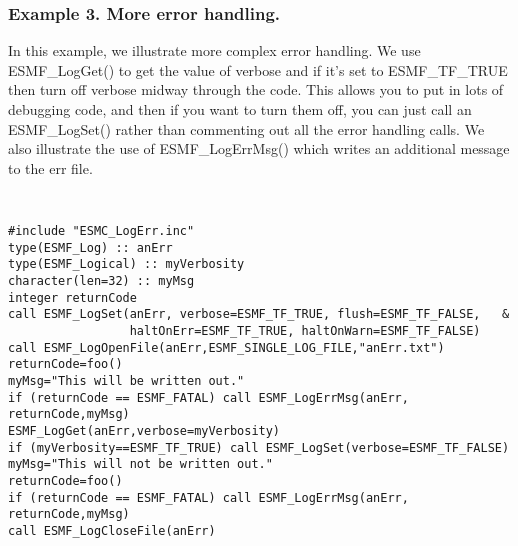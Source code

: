 \subsubsection{Example 3. More error handling.}

In this example, we illustrate more complex error handling.  We use
ESMF\_LogGet() to get the value of verbose and if it's set to ESMF\_TF\_TRUE
then turn off verbose midway through the code.  This allows you to put in lots
of debugging code, and then if you want to turn them off, you can just call
an ESMF\_LogSet() rather than commenting out all the error handling calls.
We also illustrate the use 
of ESMF\_LogErrMsg() which writes an additional message to the err file.

{\tt
\begin{verbatim}
#include "ESMC_LogErr.inc" 
type(ESMF_Log) :: anErr
type(ESMF_Logical) :: myVerbosity
character(len=32) :: myMsg
integer returnCode 
call ESMF_LogSet(anErr, verbose=ESMF_TF_TRUE, flush=ESMF_TF_FALSE,   &
                 haltOnErr=ESMF_TF_TRUE, haltOnWarn=ESMF_TF_FALSE)
call ESMF_LogOpenFile(anErr,ESMF_SINGLE_LOG_FILE,"anErr.txt")
returnCode=foo()
myMsg="This will be written out."
if (returnCode == ESMF_FATAL) call ESMF_LogErrMsg(anErr, returnCode,myMsg) 
ESMF_LogGet(anErr,verbose=myVerbosity)
if (myVerbosity==ESMF_TF_TRUE) call ESMF_LogSet(verbose=ESMF_TF_FALSE)
myMsg="This will not be written out."
returnCode=foo()
if (returnCode == ESMF_FATAL) call ESMF_LogErrMsg(anErr, returnCode,myMsg)
call ESMF_LogCloseFile(anErr)
\end{verbatim}
\tt}




